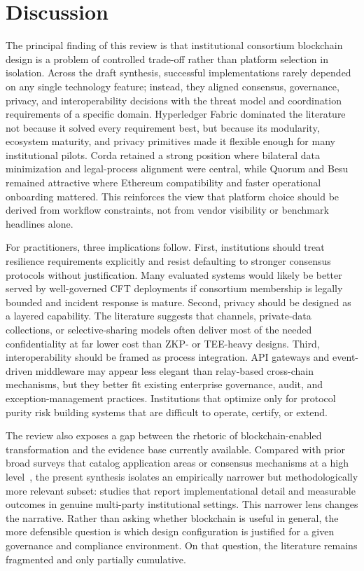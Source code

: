 \documentclass[journal]{IEEEtran}
\begin{document}
\section{Discussion}
\label{sec:discussion}

The principal finding of this review is that institutional consortium blockchain design is a problem of controlled trade-off rather than platform selection in isolation. Across the draft synthesis, successful implementations rarely depended on any single technology feature; instead, they aligned consensus, governance, privacy, and interoperability decisions with the threat model and coordination requirements of a specific domain. Hyperledger Fabric dominated the literature not because it solved every requirement best, but because its modularity, ecosystem maturity, and privacy primitives made it flexible enough for many institutional pilots. Corda retained a strong position where bilateral data minimization and legal-process alignment were central, while Quorum and Besu remained attractive where Ethereum compatibility and faster operational onboarding mattered. This reinforces the view that platform choice should be derived from workflow constraints, not from vendor visibility or benchmark headlines alone.

For practitioners, three implications follow. First, institutions should treat resilience requirements explicitly and resist defaulting to stronger consensus protocols without justification. Many evaluated systems would likely be better served by well-governed CFT deployments if consortium membership is legally bounded and incident response is mature. Second, privacy should be designed as a layered capability. The literature suggests that channels, private-data collections, or selective-sharing models often deliver most of the needed confidentiality at far lower cost than ZKP- or TEE-heavy designs. Third, interoperability should be framed as process integration. API gateways and event-driven middleware may appear less elegant than relay-based cross-chain mechanisms, but they better fit existing enterprise governance, audit, and exception-management practices. Institutions that optimize only for protocol purity risk building systems that are difficult to operate, certify, or extend.

The review also exposes a gap between the rhetoric of blockchain-enabled transformation and the evidence base currently available. Compared with prior broad surveys that catalog application areas or consensus mechanisms at a high level~\cite{casino2019systematic,belotti2019vademecum,wang2019blockchain}, the present synthesis isolates an empirically narrower but methodologically more relevant subset: studies that report implementational detail and measurable outcomes in genuine multi-party institutional settings. This narrower lens changes the narrative. Rather than asking whether blockchain is useful in general, the more defensible question is which design configuration is justified for a given governance and compliance environment. On that question, the literature remains fragmented and only partially cumulative.
\end{document}
